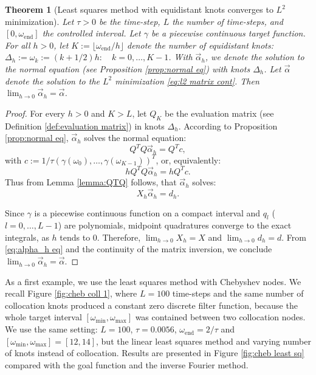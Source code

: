 \documentclass[a4paper,11pt,bibliography=totoc,listof=totoc,headinclude=true,cleardoublepage=empty,oneside]{scrbook}
\newtheorem{theorem}{Theorem}[chapter]
\newcommand{\e}{\mathrm{end}}
\begin{document}
\begin{theorem}[Least squares method with equidistant knots converges to $L^2$ minimization]\label{theorem:lsq converges to l2}
    Let $\tau>0$ be the time-step, $L$ the number of time-steps, and $[0, \omega_\e]$ the controlled interval. Let $\gamma$ be a piecewise continuous target function. For all $h>0$, let $K := \lfloor \omega_\e/h\rfloor $ denote the number of equidistant knots: $ \Delta_h := {\omega_k := (k+1/2)h : \quad k=0, \dots, K-1}$. With $\Vec{\alpha}_h$, we denote the solution to the normal equation (see Proposition \ref{prop:normal eq}) with knots $\Delta_h$. Let $\Vec{\alpha}$ denote the solution to the $L^2$ minimization \eqref{eq:l2 matrix cont}. Then $\lim_{h\rightarrow 0} \Vec{\alpha}_h = \Vec{\alpha}$.

\end{theorem}
\begin{proof}
    For every $h>0$ and $K>L$, let $Q_K$ be the evaluation matrix (see Definition \ref{def:evaluation matrix}) in knots $\Delta_h$. According to Proposition \ref{prop:normal eq}, $\Vec{\alpha}_h$ solves the normal equation: 
    \begin{equation*}
        Q^T Q \Vec{\alpha}_h = Q^Tc,
    \end{equation*}
    with $c:= 1/\tau \left(\gamma(\omega_0), \dots, \gamma(\omega_{K-1})\right)^T$, or, equivalently:
    \begin{equation*}
        hQ^T Q \Vec{\alpha}_h = hQ^Tc.
    \end{equation*}
    Thus from Lemma \ref{lemma:QTQ} follows, that $\Vec{\alpha}_h$ solves:
    \begin{equation}\label{eq:alpha_h eq}
        X_h \Vec{\alpha}_h = d_h.
    \end{equation}
    
    Since $\gamma$ is a piecewise continuous function on a compact interval and $q_l$ ($l = 0, \dots, L-1$) are polynomials, midpoint quadratures converge to the exact integrals, as $h$ tends to 0. Therefore, $\lim_{h\rightarrow 0} X_h = X$ and $\lim_{h\rightarrow 0} d_h = d$. From \eqref{eq:alpha_h eq} and the continuity of the matrix inversion, we conclude $\lim_{h\rightarrow 0} \Vec{\alpha}_h = \Vec{\alpha}$.
\end{proof}

As a first example, we use the least squares method with Chebyshev nodes. We recall Figure \ref{fig:cheb coll 1}, where $L=100$ time-steps and the same number of collocation knots produced a constant zero discrete filter function, because the whole target interval $\left[\omega_{\min}, \omega_{\max}\right]$ was contained between two collocation nodes. We use the same setting: $L=100$, $\tau = 0.0056$, $\omega_\e = 2/\tau$ and $\left[\omega_{\min}, \omega_{\max}\right] = [12, 14]$, but the linear least squares method  and varying number of knots instead of collocation. Results are presented in Figure \ref{fig:cheb least sq} compared with the goal function and the inverse Fourier method.
\end{document}
